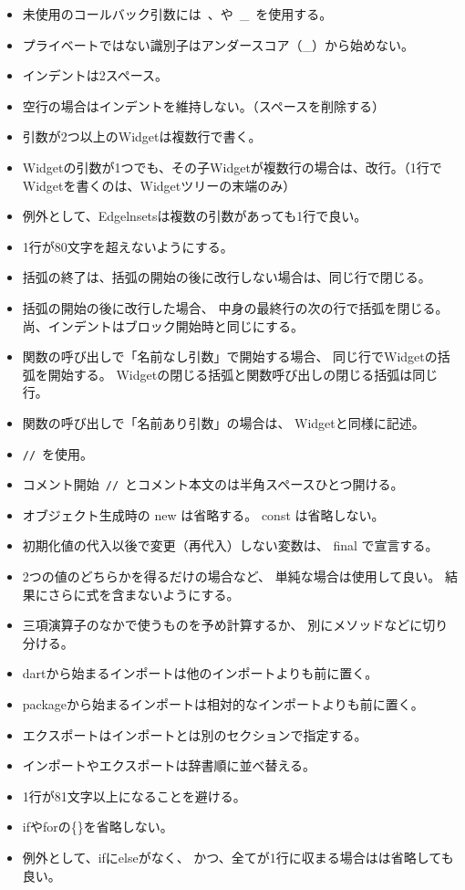 \begin{itemize}
      \item 未使用のコールバック引数には\ 、や\ \_\ を使用する。
      \item プライベートではない識別子はアンダースコア（\_）から始めない。
      \item インデントは2スペース。
      \item 空行の場合はインデントを維持しない。（スペースを削除する）
      \item 引数が2つ以上のWidgetは複数行で書く。
      \item Widgetの引数が1つでも、その子Widgetが複数行の場合は、改行。（1行でWidgetを書くのは、Widgetツリーの末端のみ）
      \item 例外として、Edgelnsetsは複数の引数があっても1行で良い。
      \item 1行が80文字を超えないようにする。
      \item 括弧の終了は、括弧の開始の後に改行しない場合は、同じ行で閉じる。
      \item 括弧の開始の後に改行した場合、
      中身の最終行の次の行で括弧を閉じる。
      尚、インデントはブロック開始時と同じにする。
      \item 関数の呼び出しで「名前なし引数」で開始する場合、
      同じ行でWidgetの括弧を開始する。
      Widgetの閉じる括弧と関数呼び出しの閉じる括弧は同じ行。
      \item 関数の呼び出しで「名前あり引数」の場合は、
      Widgetと同様に記述。
      \item \verb|//|\ を使用。
      \item コメント開始\ \verb|//|\ とコメント本文のは半角スペースひとつ開ける。
      \item オブジェクト生成時の new は省略する。 const は省略しない。
      \item 初期化値の代入以後で変更（再代入）しない変数は、
      final で宣言する。
      \item 2つの値のどちらかを得るだけの場合など、
      単純な場合は使用して良い。
      結果にさらに式を含まないようにする。
      \item 三項演算子のなかで使うものを予め計算するか、
      別にメソッドなどに切り分ける。
      \item dart\:から始まるインポートは他のインポートよりも前に置く。
      \item package\:から始まるインポートは相対的なインポートよりも前に置く。
      \item エクスポートはインポートとは別のセクションで指定する。
      \item インポートやエクスポートは辞書順に並べ替える。
      \item 1行が81文字以上になることを避ける。
      \item ifやforの\{\}を省略しない。
      \item 例外として、ifにelseがなく、
      かつ、全てが1行に収まる場合は{}は省略しても良い。

\end{itemize}


